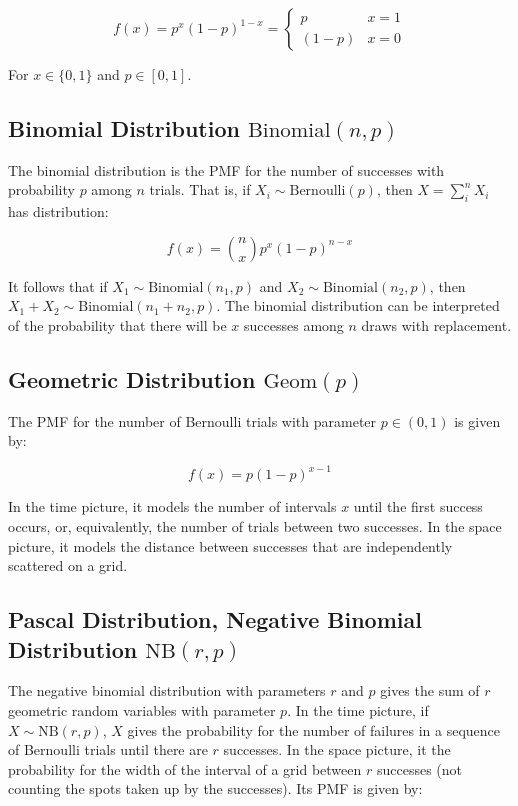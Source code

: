 \begin{equation}
f(x) = p^x (1-p)^{1-x} =  \left\{\begin{array}{cl} 
p& x = 1\\
(1-p)& x=0
\end{array} \right.
\end{equation}

For $x\in\{0,1\}$ and $p\in[0,1]$.


\subsection{Binomial Distribution $\mathrm{Binomial}(n,p)$}
The binomial distribution is the PMF for the number of successes with probability $p$ among $n$ trials. That is, if $X_i \sim \mathrm{Bernoulli}(p)$, then $X = \sum_i^n X_i$ has distribution:

\begin{equation}
f(x) = {n \choose x} p^x (1-p)^{n-x}
\end{equation}

It follows that if $X_1 \sim \mathrm{Binomial}(n_1,p)$ and $X_2 \sim \mathrm{Binomial}(n_2,p)$, then $X_1 + X_2 \sim \mathrm{Binomial}(n_1+n_2,p)$. The binomial distribution can be interpreted of the probability that there will be $x$ successes among $n$ draws with replacement.


\subsection{Geometric Distribution $\mathrm{Geom}(p)$}
The PMF for the number of Bernoulli trials with parameter $p\in(0,1)$ is given by: 

\begin{equation}
f(x) = p(1-p)^{x-1}
\end{equation}

In the time picture, it models the number of intervals $x$ until the first success occurs, or, equivalently, the number of trials between two successes. In the space picture, it models the distance between successes that are independently scattered on a grid.



\subsection{Pascal Distribution, Negative Binomial Distribution $\mathrm{NB}(r,p)$}
The negative binomial distribution with parameters $r$ and $p$ gives the sum of $r$ geometric random variables with parameter $p$. In the time picture, if $X \sim \mathrm{NB}(r,p)$, $X$ gives the probability for the number of failures in a sequence of Bernoulli trials until there are $r$ successes. In the space picture, it the probability for the width of the interval of a grid between $r$ successes (not counting the spots taken up by the successes). Its PMF is given by:

